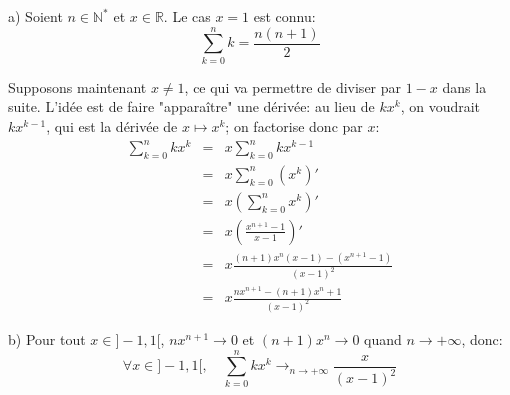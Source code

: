 a) Soient $n\in\mathbb{N}^*$ et $x\in\mathbb{R}$. Le cas $x=1$ est connu:
\[
\sum_{k=0}^n{k} = \frac{n(n+1)}{2}
\]

Supposons maintenant $x\neq 1$, ce qui va permettre de diviser par $1-x$ dans la suite. L’idée est de faire "apparaître" une dérivée: au lieu de $kx^k$, on voudrait $kx^{k-1}$, qui est la dérivée de $x\mapsto x^{k}$; on factorise donc par $x$:
\begin{eqnarray}
\sum_{k=0}^n{kx^k} &=& x\sum_{k=0}^n{kx^{k-1}} \nonumber \\
 &=& x\sum_{k=0}^n{\left( x^k \right)'} \nonumber \\
  &=& x \left( \sum_{k=0}^n{ x^k }\right)' \nonumber \\
  &=& x \left( \frac{x^{n+1}-1}{x-1} \right)' \nonumber \\
  &=& x \frac{(n+1)x^n(x-1)-(x^{n+1}-1)}{(x-1)^2} \nonumber \\
  &=& x \frac{nx^{n+1}-(n+1)x^n+1}{(x-1)^2} \nonumber
\end{eqnarray}

b) Pour tout $x\in ]-1,1[$, $nx^{n+1}\to 0$ et $(n+1)x^n\to 0$ quand $n\to+\infty$, donc:
\[
\forall x\in ]-1,1[, \quad \sum_{k=0}^n{kx^k} \mathop{\to}_{n\to +\infty} \frac{x}{(x-1)^2}
\]
